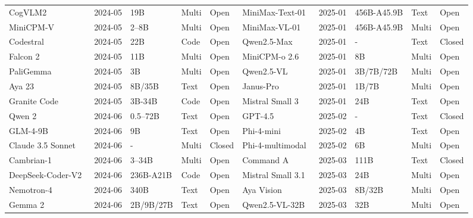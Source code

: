 \begin{table}[!p]
{\begin{tabular}{@{} lllll | lllll @{}}
CogVLM2~\cite{hong2024cogvlm2} & 2024-05 & 19B & Multi & Open & MiniMax-Text-01~\cite{minimax2025minimax01scalingfoundationmodels} & 2025-01 & 456B-A45.9B & Text & Open \\
MiniCPM-V~\cite{yao2024minicpmv} & 2024-05 & 2--8B & Multi & Open & MiniMax-VL-01~\cite{minimax2025minimax01scalingfoundationmodels} & 2025-01 & 456B-A45.9B & Multi & Open \\
Codestral~\cite{mistral2024codestral} & 2024-05 & 22B & Code & Open & Qwen2.5-Max~\cite{qwen2025qwen25max} & 2025-01 & - & Text & Closed \\
Falcon 2~\cite{malartic2024falcon2} & 2024-05 & 11B & Multi & Open & MiniCPM-o 2.6~\cite{openbmb2025minicpmo26} & 2025-01 & 8B & Multi & Open \\
PaliGemma~\cite{beyer2024paligemma} & 2024-05 & 3B & Multi & Open & Qwen2.5-VL~\cite{bai2025qwen2} & 2025-01 & 3B/7B/72B & Multi & Open \\
Aya 23~\cite{aryabumi2024aya} & 2024-05 & 8B/35B & Text & Open & Janus-Pro~\cite{chen2025janus} & 2025-01 & 1B/7B & Multi & Open \\
Granite Code~\cite{mishra2024granite} & 2024-05 & 3B-34B & Code & Open & Mistral Small 3~\cite{mistral2025mistralsmall3} & 2025-01 & 24B & Text & Open \\
Qwen 2~\cite{qwen2024qwen2} & 2024-06 & 0.5--72B & Text & Open & GPT-4.5~\cite{openai2025gpt45} & 2025-02 & - & Text & Closed \\
GLM-4-9B~\cite{glm2024glm4} & 2024-06 & 9B & Text & Open & Phi-4-mini~\cite{abouelenin2025phi} & 2025-02 & 4B & Text & Open \\
Claude 3.5 Sonnet~\cite{anthropic2024claude35} & 2024-06 & - & Multi & Closed & Phi-4-multimodal~\cite{abouelenin2025phi} & 2025-02 & 6B & Multi & Open \\
Cambrian-1~\cite{tong2024cambrian} & 2024-06 & 3--34B & Multi & Open & Command A~\cite{cohere2025commanda} & 2025-03 & 111B & Text & Closed \\
DeepSeek-Coder-V2~\cite{deepseek2024coderv2} & 2024-06 & 236B-A21B & Code & Open & Mistral Small 3.1~\cite{mistral2025small31} & 2025-03 & 24B & Multi & Open \\
Nemotron-4~\cite{nvidia2024nemotron} & 2024-06 & 340B & Text & Open & Aya Vision~\cite{dash2025aya} & 2025-03 & 8B/32B & Multi & Open \\
Gemma 2~\cite{google2024gemma2} & 2024-06 & 2B/9B/27B & Text & Open & Qwen2.5-VL-32B~\cite{qwen2025qwen25vl32b} & 2025-03 & 32B & Multi & Open \\

\end{tabular}}
\end{table}
